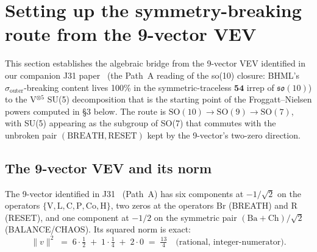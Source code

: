 
\section{Setting up the symmetry-breaking route from the 9-vector VEV}
\label{sec:yukawa-scaffolding}

This section establishes the algebraic bridge from the 9-vector VEV
identified in our companion J31 paper~\cite{SandersGishPatiSalam} (the
Path~A reading of the so(10) closure: BHML's $\sigma_{\mathrm{outer}}$-breaking
content lives 100\% in the symmetric-traceless $\mathbf{54}$ irrep of
$\mathfrak{so}(10)$) to the V$^{\otimes 5}$ SU(5) decomposition that is
the starting point of the Froggatt--Nielsen powers computed in §3
below. The route is $\mathrm{SO}(10) \to \mathrm{SO}(9) \to \mathrm{SO}(7)$,
with SU(5) appearing as the subgroup of SO(7) that commutes with the
unbroken pair $(\mathrm{BREATH}, \mathrm{RESET})$ kept by the 9-vector's two-zero
direction.

\subsection{The 9-vector VEV and its norm}
\label{subsec:9vec}

The 9-vector identified in J31~\cite{SandersGishPatiSalam} (Path~A)
has six components at $-1/\sqrt{2}$ on the operators
$\{\mathrm{V}, \mathrm{L}, \mathrm{C}, \mathrm{P}, \mathrm{Co}, \mathrm{H}\}$,
two zeros at the operators $\mathrm{Br}$ (BREATH) and $\mathrm{R}$
(RESET), and one component at $-1/2$ on the symmetric pair
$(\mathrm{Ba} + \mathrm{Ch})/\sqrt{2}$ (BALANCE/CHAOS). Its squared
norm is exact:
\begin{equation}
\|v\|^2
\;=\;
6 \cdot \tfrac{1}{2} \;+\; 1 \cdot \tfrac{1}{4} \;+\; 2 \cdot 0
\;=\;
\tfrac{13}{4}
\quad\text{(rational, integer-numerator).}
\label{eq:vnorm}
\end{equation}

